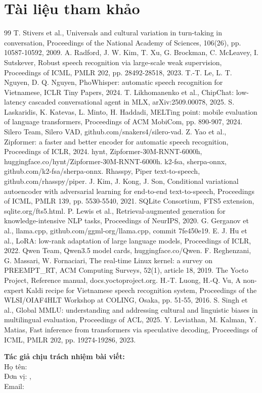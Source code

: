 \documentclass[a4paper,12pt,twocolumn]{article}
\begin{document}
\section{Tài liệu tham khảo}
\vspace{-20pt}
{\small\setlength{\parskip}{0pt}\raggedright
\begin{thebibliography}{99}\setlength{\itemsep}{1pt}
 T. Stivers et al., Universals and cultural variation in turn-taking in conversation, Proceedings of the National Academy of Sciences, 106(26), pp. 10587-10592, 2009.
 A. Radford, J. W. Kim, T. Xu, G. Brockman, C. McLeavey, I. Sutskever, Robust speech recognition via large-scale weak supervision, Proceedings of ICML, PMLR 202, pp. 28492-28518, 2023.
 T.-T. Le, L. T. Nguyen, D. Q. Nguyen, PhoWhisper: automatic speech recognition for Vietnamese, ICLR Tiny Papers, 2024.
 T. Likhomanenko et al., ChipChat: low-latency cascaded conversational agent in MLX, arXiv:2509.00078, 2025.
 S. Laskaridis, K. Katevas, L. Minto, H. Haddadi, MELTing point: mobile evaluation of language transformers, Proceedings of ACM MobiCom, pp. 890-907, 2024.
 Silero Team, Silero VAD, github.com/snakers4/silero-vad.
 Z. Yao et al., Zipformer: a faster and better encoder for automatic speech recognition, Proceedings of ICLR, 2024.
 hynt, Zipformer-30M-RNNT-6000h, huggingface.co/hynt/Zipformer-30M-RNNT-6000h.
 k2-fsa, sherpa-onnx, github.com/k2-fsa/sherpa-onnx.
 Rhasspy, Piper text-to-speech, github.com/rhasspy/piper.
 J. Kim, J. Kong, J. Son, Conditional variational autoencoder with adversarial learning for end-to-end text-to-speech, Proceedings of ICML, PMLR 139, pp. 5530-5540, 2021.
 SQLite Consortium, FTS5 extension, sqlite.org/fts5.html.
 P. Lewis et al., Retrieval-augmented generation for knowledge-intensive NLP tasks, Proceedings of NeurIPS, 2020.
 G. Gerganov et al., llama.cpp, github.com/ggml-org/llama.cpp, commit 7fe450e19.
 E. J. Hu et al., LoRA: low-rank adaptation of large language models, Proceedings of ICLR, 2022.
 Qwen Team, Qwen3.5 model cards, huggingface.co/Qwen.
 F. Reghenzani, G. Massari, W. Fornaciari, The real-time Linux kernel: a survey on PREEMPT\_RT, ACM Computing Surveys, 52(1), article 18, 2019.
 The Yocto Project, Reference manual, docs.yoctoproject.org.
 H.-T. Luong, H.-Q. Vu, A non-expert Kaldi recipe for Vietnamese speech recognition system, Proceedings of the WLSI/OIAF4HLT Workshop at COLING, Osaka, pp. 51-55, 2016.
 S. Singh et al., Global MMLU: understanding and addressing cultural and linguistic biases in multilingual evaluation, Proceedings of ACL, 2025.
 Y. Leviathan, M. Kalman, Y. Matias, Fast inference from transformers via speculative decoding, Proceedings of ICML, PMLR 202, pp. 19274-19286, 2023.
\end{thebibliography}}

\vspace{4pt}
\noindent\begin{minipage}{\columnwidth}\setlength{\parskip}{0pt}
\textbf{Tác giả chịu trách nhiệm bài viết:}\\
Họ tên: \svmot\\
Đơn vị: \khoa, \truong\\
Email: \emailmot
\end{minipage}
\end{document}
